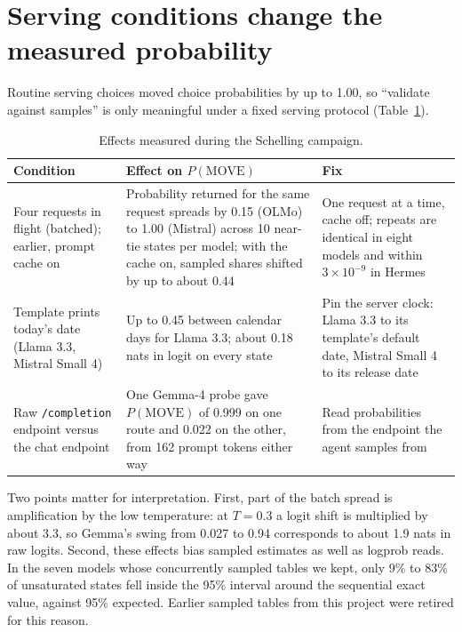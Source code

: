 \section{Serving conditions change the measured probability}
\label{sec:serving}

Routine serving choices moved choice probabilities by up to 1.00, so ``validate against samples'' is only meaningful under a fixed serving protocol (Table~\ref{tab:serving}).

\begin{table}[t]
\centering
\small
\begin{tabular}{p{}p{}p{}}
\toprule
Condition & Effect on $P(\text{MOVE})$ & Fix \\
\midrule
Four requests in flight (batched); earlier, prompt cache on &
Probability returned for the same request spreads by 0.15 (OLMo) to 1.00 (Mistral) across 10 near-tie states per model; with the cache on, sampled shares shifted by up to about 0.44 &
One request at a time, cache off; repeats are identical in eight models and within $3\times10^{-9}$ in Hermes \\
Template prints today's date (Llama 3.3, Mistral Small 4) &
Up to 0.45 between calendar days for Llama 3.3; about 0.18 nats in logit on every state &
Pin the server clock: Llama 3.3 to its template's default date, Mistral Small 4 to its release date \\
Raw \texttt{/completion} endpoint versus the chat endpoint &
One Gemma-4 probe gave $P(\text{MOVE})$ of 0.999 on one route and 0.022 on the other, from 162 prompt tokens either way &
Read probabilities from the endpoint the agent samples from \\
\bottomrule
\end{tabular}
\caption{Effects measured during the Schelling campaign. }
\label{tab:serving}
\end{table}

Two points matter for interpretation.
First, part of the batch spread is amplification by the low temperature: at $T=0.3$ a logit shift is multiplied by about 3.3, so Gemma's swing from 0.027 to 0.94 corresponds to about 1.9 nats in raw logits.
Second, these effects bias sampled estimates as well as logprob reads.
In the seven models whose concurrently sampled tables we kept, only 9\% to 83\% of unsaturated states fell inside the 95\% interval around the sequential exact value, against 95\% expected.
Earlier sampled tables from this project were retired for this reason.
